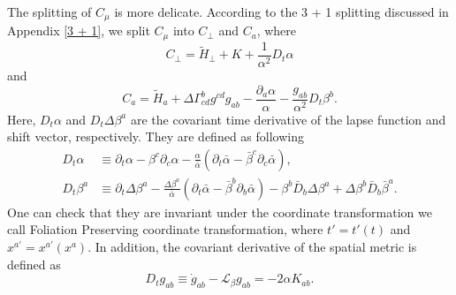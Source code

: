 \documentclass[letterpaper,nofootinbib,prd,amsmath,onecolumn]{revtex4-1}
\begin{document}
The splitting of $C_{\mu}$ is more delicate. According to the 3 + 1 splitting discussed in Appendix \ref{3 + 1}, we split $C_{\mu}$ into $C_{\perp}$ and $C_{a}$, where
\begin{equation}
C_{\perp} = {\tilde H}_{\perp} + K + \frac{1}{\alpha^{2}}D_{t}\alpha
\end{equation}
and
\begin{equation}
C_{a} = {\tilde H}_{a} + \Delta \Gamma^{b}_{cd}g^{cd}g_{ab} - \frac{\partial_{a}\alpha}{\alpha} - \frac{g_{ab}}{\alpha^2}D_{t}\beta^{b}.
\end{equation}
Here, $D_{t}\alpha$ and $D_{t}\Delta \beta^{a}$ are the covariant time derivative of the lapse function and shift vector, respectively\cite{Meng}. They are defined as following
\begin{subequations}\label{covariant lapse and shift}
\begin{align}
D_{t}\alpha &\equiv \partial_{t}\alpha - \beta^{c}\partial_{c}\alpha - \frac{\alpha}{{\bar \alpha}}\left(\partial_{t}{\bar \alpha} - {\bar \beta}^{c}\partial_{c}{\bar \alpha}\right), \\
D_{t}\beta^{a} &\equiv \partial_{t}\Delta \beta^{a} - \frac{\Delta \beta^{a}}{{\bar \alpha}}\left(\partial_{t}{\bar \alpha} - {\bar \beta}^{b}\partial_{b}{\bar \alpha}\right) - \beta^{b}{\bar D}_{b}\Delta \beta^{a} + \Delta \beta^{b}{\bar D}_{b}{\bar \beta}^{a}.
\end{align}
\end{subequations}
One can check that they are invariant under the coordinate transformation we call Foliation Preserving coordinate transformation, where $t' = t'(t)$ and $x^{a'} = x^{a'}(x^{a})$. In addition, the covariant derivative of the spatial metric is defined as
\begin{equation}\label{covariant spatial metric}
D_{t}g_{ab} \equiv {\dot g}_{ab} - \mathcal{L}_{\beta}g_{ab} = -2\alpha K_{ab}.
\end{equation}
\end{document}

